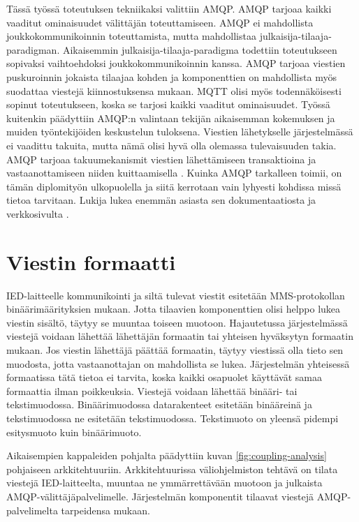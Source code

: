 Tässä työssä toteutuksen tekniikaksi valittiin AMQP. AMQP tarjoaa kaikki vaaditut ominaisuudet välittäjän toteuttamiseen. AMQP ei mahdollista joukkokommunikoinnin toteuttamista, mutta mahdollistaa julkaisija-tilaaja-paradigman. Aikaisemmin julkaisija-ti\-laa\-ja-paradigma todettiin toteutukseen sopivaksi vaihtoehdoksi joukkokommunikoinnin kanssa. AMQP tarjoaa viestien puskuroinnin jokaista tilaajaa kohden ja komponenttien on mahdollista myös suodattaa viestejä kiinnostuksensa mukaan. MQTT olisi myös todennäköisesti sopinut toteutukseen, koska se tarjosi kaikki vaaditut ominaisuudet. Työssä kuitenkin päädyttiin AMQP:n valintaan tekijän aikaisemman kokemuksen ja muiden työntekijöiden keskustelun tuloksena. Viestien lähetykselle järjestelmässä ei vaadittu takuita, mutta nämä olisi hyvä olla olemassa tulevaisuuden takia. AMQP tarjoaa takuumekanismit viestien lähettämiseen transaktioina ja vastaanottamiseen niiden kuittaamisella \cite[s.~14,21]{AMQP-specification}. Kuinka AMQP tarkalleen toimii, on tämän diplomityön ulkopuolella ja siitä kerrotaan vain lyhyesti kohdissa missä tietoa tarvitaan. Lukija lukea enemmän asiasta sen dokumentaatiosta \cite{AMQP-specification} ja verkkosivulta \cite{amqp-homepage}.


\section{Viestin formaatti}
IED-laitteelle kommunikointi ja siltä tulevat viestit esitetään MMS-protokollan binäärimäärityksien mukaan. Jotta tilaavien komponenttien olisi helppo lukea viestin sisältö, täytyy se muuntaa toiseen muotoon. Hajautetussa järjestelmässä viestejä voidaan lähettää lähettäjän formaatin tai yhteisen hyväksytyn formaatin mukaan. Jos viestin lähettäjä päättää formaatin, täytyy viestissä olla tieto sen muodosta, jotta vastaanottajan on mahdollista se lukea. Järjestelmän yhteisessä formaatissa tätä tietoa ei tarvita, koska kaikki osapuolet käyttävät samaa formaattia ilman poikkeuksia. Viestejä voidaan lähettää binääri- tai tekstimuodossa. Binäärimuodossa datarakenteet esitetään binääreinä ja tekstimuodossa ne esitetään tekstimuodossa. Tekstimuoto on yleensä pidempi esitysmuoto kuin binäärimuoto.

Aikaisempien kappaleiden pohjalta päädyttiin kuvan \ref{fig:coupling-analysis} pohjaiseen arkkitehtuuriin. Arkkitehtuurissa väliohjelmiston tehtävä on tilata viestejä IED-laitteelta, muuntaa ne ymmärrettävään muotoon ja julkaista AMQP-välittäjäpalvelimelle. Järjestelmän komponentit tilaavat viestejä AMQP-palvelimelta tarpeidensa mukaan.

